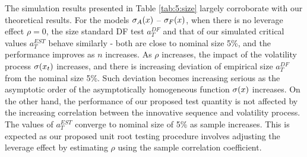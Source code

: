 The simulation results presented in Table \ref{tab:5:size} largely corroborate with our theoretical results. For the models $\sigma_A(x)$ -- $\sigma_F(x)$, when there is no leverage effect $\rho = 0$, the size standard DF test $a_{T}^{DF}$ and that of our simulated critical values $a_{T}^{EST}$ behave similarly - both are close to nominal size 5\%, and the performance improves as $n$ increases. As $\rho$ increases, the impact of the volatility process $\sigma(x_t)$ increases, and there is increasing deviation of empirical size $a_{T}^{DF}$ from the nominal size 5\%. Such deviation becomes increasing serious as the asymptotic order  of  the asymptotically homogeneous function $\sigma(x)$ increases. On the other hand, the performance of our proposed test quantity is not affected by the increasing correlation between the innovative sequence and volatility process. The values of $a_{T}^{EST}$ converge to nominal size of 5\% as sample increases. This is expected as our proposed unit root testing procedure involves adjusting the leverage effect by estimating $\rho$ using the sample correlation coefficient.
\begin{table}[!ht] 
\selectfont \caption{The empirical size of unit root test based on standard critical values $\Psi(W)$ and simulated critical values $T( \widehat{\al}^*_{n,T} - 1)$.}
\label{GseqTable} 
\end{table}



